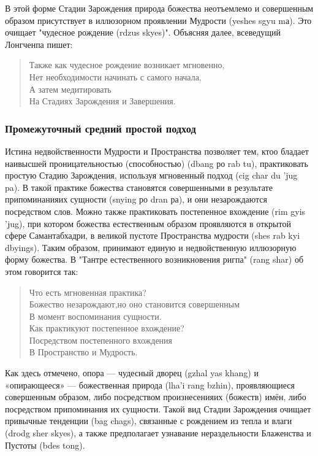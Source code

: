 В этой форме Стадии Зарождения природа божества неотъем\-лемо и совершенным
образом присутствует в иллюзорном проявлении Мудрости (yeshes sgyu mа).
Это очищает "чудесное рождение (rdzus skyes)". Объясняя далее, всеведущий Лонгчен\-па пишет:

\begin{verse}
Также как чудесное рождение возникает мгновенно,\\
Нет необходимости начинать с самого начала,\\
А затем медитировать\\
На Стадиях Зарождения и Завершения.\\
\end{verse}

\newpage
\subsubsection{Промежуточный средний простой подход}
\vspace{1cm}
Истина недвойственности Мудрости и Пространства позволяет тем, ктоо бладает
наивысшей проницательностью (способно\-стью) (dbang ро rab tu), практиковать простую
Стадию Зарож\-дения, используя мгновенный подход (cig char du 'jug pa). В такой практике
божества становятся совершенными в резуль\-тате припоминанияих сущности (snying ро dran
ра), и они незарождаются посредством слов. Можно также практиковать постепенное
вхождение (rim gyis 'jug), при котором божества естественным образом проявляются в
открытой сфере Саманта\-бхадри, в великой пустоте Пространства мудрости (shes rab kyi
dbyings). Таким образом, принимают единую и недвойственную иллюзорную форму
божества. В "Тантре естественного возник\-новения ригпа" (rang shar) об этом говорится так:

\begin{verse}
Что есть мгновенная практика?\\
Божество незарождают,но оно становится совершенным\\
В момент воспоминания сущности.\\
Как практикуют постепенное вхождение?\\
Посредством постепенного вхождения\\
В Пространство и Мудрость.\\
\end{verse}

Как здесь отмечено, опора — чудесный дворец (gzhal yas khang) и «опирающееся» —
божественная природа (lha'i rang bzhin), проявляющиеся совершенным
образом, либо посред\-ством произнесенияих (божеств) имён, либо посредством
при\-поминания их сущности. Такой вид Стадии Зарождения очища\-ет привычные тенденции
(bag chags), связанные с рождением из тепла и влаги (drodg sher skyes), а также
предполагает узнавание нераздельности Блаженства и Пустоты (bdes tong).

